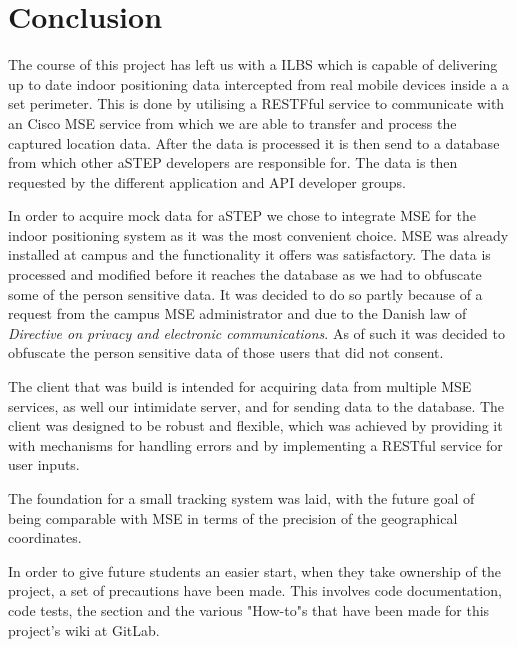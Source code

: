 \chapter{Conclusion}
The course of this project has left us with a ILBS which is capable of delivering up to date indoor positioning data intercepted from real mobile devices inside a a set perimeter. This is done by utilising a RESTFful service to communicate with an Cisco MSE service from which we are able to transfer and process the captured location data. After the data is processed it is then send to a database from which other aSTEP developers are responsible for. The data is then requested by the different application and API developer groups.

In order to acquire mock data for aSTEP we chose to integrate MSE for the indoor positioning system as it was the most convenient choice. MSE was already installed at campus and the functionality it offers was satisfactory. %
The data is processed and modified before it reaches the database as we had to obfuscate some of the person sensitive data. It was decided to do so partly because of a request from the campus MSE administrator and due to the Danish law of \textit{Directive on privacy and electronic communications}. As of such it was decided to obfuscate the person sensitive data of those users that did not consent.

The client that was build is intended for acquiring data from multiple MSE services, as well our intimidate server, and for sending data to the database. The client was designed to be robust and flexible, which was achieved by providing it with mechanisms for handling errors and by implementing a RESTful service for user inputs. 

The foundation for a small tracking system was laid, with the future goal of being comparable with MSE in terms of the precision of the geographical coordinates. %

In order to give future students an easier start, when they take ownership of the project, a set of precautions have been made. This involves code documentation, code tests, the section  and the various "How-to"s that have been made for this project's wiki at GitLab. 


